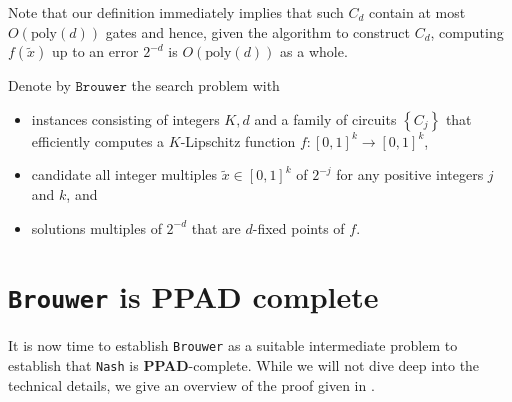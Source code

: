 \documentclass{article}
\begin{document}
Note that our definition immediately implies that such $C_d$ contain
at most $O(\text{poly}(d))$ gates and hence, given the algorithm to
construct $C_d$, computing $f(\tilde x)$ up to an error $2^{-d}$ is
$O(\text{poly}(d))$ as a whole.

\begin{definition}
  Denote by $\texttt{Brouwer}$ the search problem with
  \begin{itemize}
    \item instances consisting of integers $K,d$ and a family of
      circuits $\left\lbrace{C_j}\right\rbrace$ that
      efficiently computes a $K$-Lipschitz function $f:\left[{0,1}\right]^k\to\left[{0,1}\right]^k$,
    \item candidate all integer multiples $\tilde x\in\left[{0,1}\right]^k$ of $2^{-j}$ for any positive integers $j$ and $k$, and
    \item solutions multiples of $2^{-d}$ that are $d$-fixed points of $f$.
  \end{itemize}
\end{definition}

\section{\texttt{Brouwer} is PPAD complete}

It is now time to establish \texttt{Brouwer} as a suitable intermediate
problem to establish that \texttt{Nash} is \textbf{PPAD}-complete.
While we will not dive deep into the technical details, we give an overview
of the proof given in \cite{daskalakis2008}.
\end{document}
